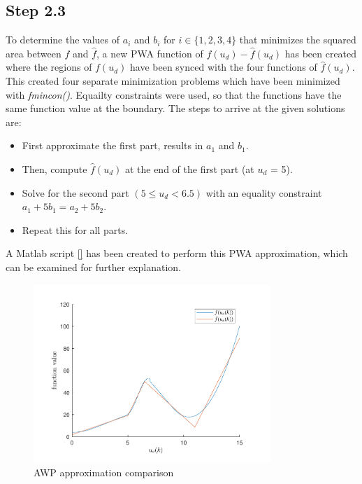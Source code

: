 \subsection*{Step 2.3}

To determine the values of $a_i$ and $b_i$ for $i \in \{1,2,3,4\}$ that minimizes the squared area between $f$ and $\hat{f}$, a new PWA function of $f(u_d)-\hat{f}(u_d)$ has been created where the regions of $f(u_d)$ have been synced with the four functions of $\hat{f}(u_d)$. This created four separate minimization problems which have been minimized with \textit{fmincon()}. Equailty constraints were used, so that the functions have the same function value at the boundary. The steps to arrive at the given solutions are:
\begin{itemize}
    \item First approximate the first part, results in $a_1$ and $b_1$.
    \item Then, compute $\hat{f}(u_d)$ at the end of the first part (at $u_d$ = 5).
    \item Solve for the second part $(5\leq u_d<6.5)$ with an equality constraint $a_1+5b_1 = a_2+5b_2$.
    \item Repeat this for all parts.
\end{itemize}
A Matlab script \ref{} has been created to perform this PWA approximation, which can be examined for further explanation.

\begin{figure}[ht]
    \centering
    \includegraphics[width=0.8\textwidth]{Latex/images/step23.pdf}
    \caption{AWP approximation comparison}
    \label{fig:part23}
\end{figure}
